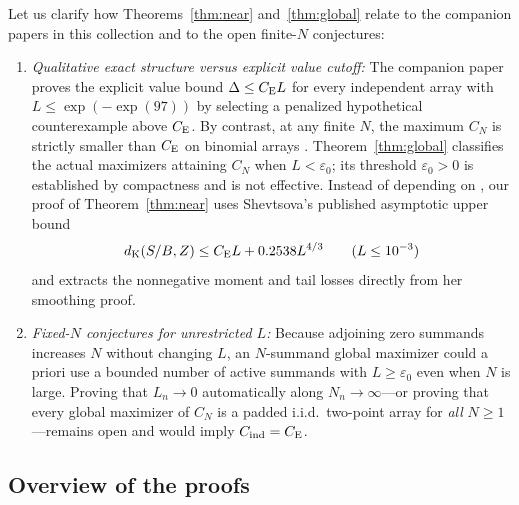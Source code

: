 \documentclass[11pt]{article}
\numberwithin{equation}{section}
\theoremstyle{remark}\newtheorem{remark}[theorem]{Remark}
\newcommand{\Cind}{C_{\mathrm{ind}}}
\begin{document}
Let us clarify how Theorems~\ref{thm:near} and~\ref{thm:global} relate to
the companion papers in this collection and to the open finite-$N$
conjectures:
\begin{enumerate}[label=(\arabic*),leftmargin=2em]
\item \emph{Qualitative exact structure versus explicit value cutoff:}
The companion paper \citet{BellSmall2026} proves the explicit value bound
$\Delta\le C_{\mathrm E} L$ for every independent array with $L\le\exp(-\exp(97))$ by
selecting a penalized hypothetical counterexample above $C_{\mathrm E}$. By contrast,
at any finite $N$, the maximum $C_N$ is strictly smaller than $C_{\mathrm E}$ on
binomial arrays \citep{Schulz2016}. Theorem~\ref{thm:global} classifies the
actual maximizers attaining $C_N$ when $L<\varepsilon_0$; its threshold
$\varepsilon_0>0$ is established by compactness and is not effective.
Instead of depending on \citet{BellSmall2026}, our proof of
Theorem~\ref{thm:near} uses Shevtsova's published asymptotic upper bound
\begin{equation}\label{eq:asymptotic-upper}
 d_{\mathrm K}(S/B,Z)\le C_{\mathrm E} L+0.2538L^{4/3}\qquad(L\le10^{-3})
\end{equation}
\citep[Corollary~4.18, p.~303]{Shevtsova2012} and extracts the nonnegative
moment and tail losses directly from her smoothing proof.
\item \emph{Fixed-$N$ conjectures for unrestricted $L$:}
Because adjoining zero summands increases $N$ without changing $L$, an
$N$-summand global maximizer could a priori use a bounded number of active
summands with $L\ge\varepsilon_0$ even when $N$ is large. Proving that
$L_n\to0$ automatically along $N_n\to\infty$---or proving that every global
maximizer of $C_N$ is a padded i.i.d.\ two-point array for \emph{all}
$N\ge1$---remains open and would imply $\Cind=\ce$.
\end{enumerate}

\subsection{Overview of the proofs}
\end{document}
